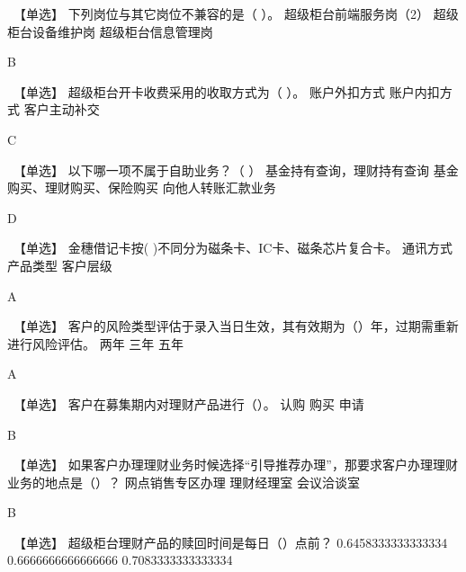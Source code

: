 \documentclass[kindlepaper]{BHCexam4kindle}
\begin{document}
\begin{questions}
\qs　【单选】 下列岗位与其它岗位不兼容的是（  ）。 \xx
{} {  超级柜台前端服务岗（2） } { 超级柜台设备维护岗 } { 超级柜台信息管理岗 }
\begin{solution} B \end{solution}
\qs　【单选】 超级柜台开卡收费采用的收取方式为（  ）。 \xx
{} {  账户外扣方式 } { 账户内扣方式 } { 客户主动补交 }
\begin{solution} C \end{solution}
\qs　【单选】 以下哪一项不属于自助业务？（  ） \xx
{} {  基金持有查询，理财持有查询 } { 基金购买、理财购买、保险购买 } { 向他人转账汇款业务 }
\begin{solution} D \end{solution}
\qs　【单选】 金穗借记卡按(    )不同分为磁条卡、IC卡、磁条芯片复合卡。 \xx
{} {  通讯方式 } { 产品类型 } { 客户层级 }
\begin{solution} A \end{solution}
\qs　【单选】 客户的风险类型评估于录入当日生效，其有效期为（）年，过期需重新进行风险评估。 \xx
{} {  两年 } { 三年 } { 五年 }
\begin{solution} A \end{solution}
\qs　【单选】 客户在募集期内对理财产品进行（）。 \xx
{} {  认购 } { 购买 } { 申请 }
\begin{solution} B \end{solution}
\qs　【单选】 如果客户办理理财业务时候选择“引导推荐办理”，那要求客户办理理财业务的地点是（）？ \xx
{} {  网点销售专区办理 } { 理财经理室 } { 会议洽谈室 }
\begin{solution} B \end{solution}
\qs　【单选】 超级柜台理财产品的赎回时间是每日（）点前？ \xx
{} {  0.6458333333333334 } { 0.6666666666666666 } { 0.7083333333333334 }

\end{questions}
\end{document}
